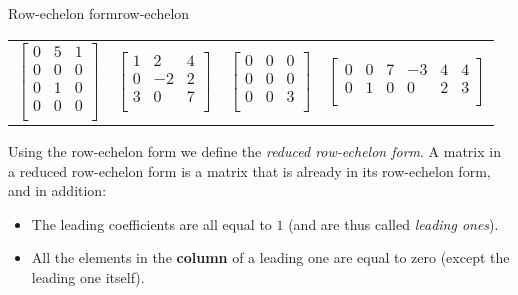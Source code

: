 \begin{example}{Row-echelon form}{row-echelon}
	\vspace{1em}
	\centering
	\begin{tabular}{cccc}
		$\begin{bmatrix}
			0 & 5 & 1\\
			0 & 0 & 0\\
			0 & 1 & 0\\
			0 & 0 & 0\\
		\end{bmatrix}$ &
		$\begin{bmatrix}
			1 &  2 & 4\\
			0 & -2 & 2\\
			3 &  0 & 7\\
		\end{bmatrix}$ &
		$\begin{bmatrix}
			0 & 0 & 0\\
			0 & 0 & 0\\
			0 & 0 & 3\\
		\end{bmatrix}$ &
		$\begin{bmatrix}
			0 & 0 & 7 & -3 & 4 & 4\\
			0 & 1 & 0 &  0 & 2 & 3\\
		\end{bmatrix}$\\
	\end{tabular}
\end{example}

Using the row-echelon form we define the \emph{reduced row-echelon form}. A matrix in a reduced row-echelon form is a matrix that is already in its row-echelon form, and in addition:
\begin{itemize}
	\item The leading coefficients are all equal to $1$ (and are thus called \emph{leading ones}).
	\item All the elements in the \textbf{column} of a leading one are equal to zero (except the leading one itself).
\end{itemize}

